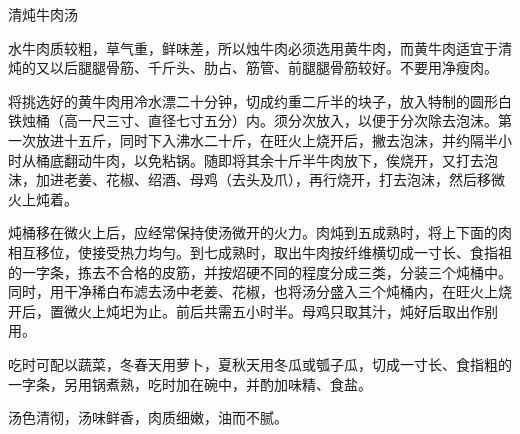 \begin{recipe}{清炖牛肉汤}

\ingredients



\cooking

水牛肉质较粗，草气重，鲜味差，所以烛牛肉必须选用黄牛肉，而黄牛肉适宜于清炖的又以后腿腿骨筋、千斤头、肋占、筋管、前腿腿骨筋较好。不要用净瘦肉。

将挑选好的黄牛肉用冷水漂二十分钟，切成约重二斤半的块子，放入特制的圆形白铁烛桶（高一尺三寸、直径七寸五分）内。须分次放入，以便于分次除去泡沫。第一次放进十五斤，同时下入沸水二十斤，在旺火上烧开后，撇去泡沫，并约隔半小时从桶底翻动牛肉，以免粘锅。随即将其余十斤半牛肉放下，俟烧开，又打去泡沫，加进老姜、花椒、绍酒、母鸡（去头及爪），再行烧开，打去泡沫，然后移微火上炖着。

炖桶移在微火上后，应经常保持使汤微开的火力。肉炖到五成熟时，将上下面的肉相互移位，使接受热力均勻。到七成熟时，取出牛肉按纤维横切成一寸长、食指祖的一字条，拣去不合格的皮筋，并按炤硬不同的程度分成三类，分装三个炖桶中。同时，用干净稀白布滤去汤中老姜、花椒，也将汤分盛入三个炖桶内，在旺火上烧开后，置微火上炖圯为止。前后共需五小时半。母鸡只取其汁，炖好后取出作别用。

吃时可配以蔬菜，冬春天用萝卜，夏秋天用冬瓜或瓠子瓜，切成一寸长、食指粗的一字条，另用锅煮熟，吃时加在碗中，并酌加味精、食盐。

\notes

汤色清彻，汤味鲜香，肉质细嫩，油而不腻。

\end{recipe}

